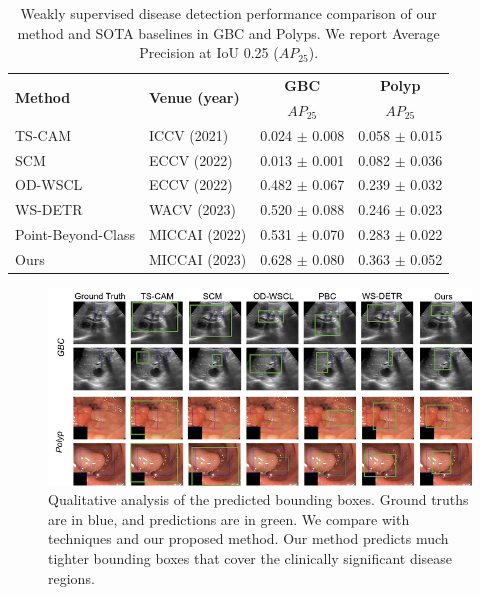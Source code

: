 %
\begin{table}[t]
	\centering
    \footnotesize
	\setlength{\tabcolsep}{10pt}
	\begin{tabular}{llcc}
		\toprule
		\multirow{2}{*}{\textbf{Method}} & \multirow{2}{*}{\textbf{Venue (year)}} & \textbf{GBC} & \textbf{Polyp} \\ 
        & & $AP_{25}$ & $AP_{25}$ \\
        \midrule
        TS-CAM \cite{tscam} & ICCV (2021) & 0.024 $\pm$ 0.008 & 0.058 $\pm$ 0.015 \\
        SCM \cite{scm} & ECCV (2022) & 0.013 $\pm$ 0.001 & 0.082 $\pm$ 0.036 \\
        OD-WSCL \cite{odwscl} & ECCV (2022) & 0.482 $\pm$ 0.067 & 0.239 $\pm$ 0.032 \\
        WS-DETR \cite{wsdetr} & WACV (2023) & 0.520 $\pm$ 0.088 & 0.246 $\pm$ 0.023 \\
        Point-Beyond-Class \cite{pointdetr} & MICCAI (2022) & 0.531 $\pm$ 0.070 & 0.283 $\pm$ 0.022 \\
        \midrule
        Ours & MICCAI (2023) & 0.628 $\pm$ 0.080 & 0.363 $\pm$ 0.052 \\
        \bottomrule
    \end{tabular}
    \caption[Weakly supervised disease detection performance of SOTA and our method]{Weakly supervised disease detection performance comparison of our method and SOTA baselines in GBC and Polyps. We report Average Precision at IoU 0.25 ($AP_{25}$).}
    \label{wsod_tab:wsod}
\end{table}

%
\begin{figure}[t]
    \centering
    \includegraphics[width=\linewidth]{figs/wsod/visual.png}
    \caption[Qualitative analysis of the predicted bounding boxes]{Qualitative analysis of the predicted bounding boxes. Ground truths are in blue, and predictions are in green. We compare with \sota \wsod techniques and our proposed method. Our method predicts much tighter bounding boxes that cover the clinically significant disease regions.}
    \label{wsod_fig:visuals}
\end{figure}

